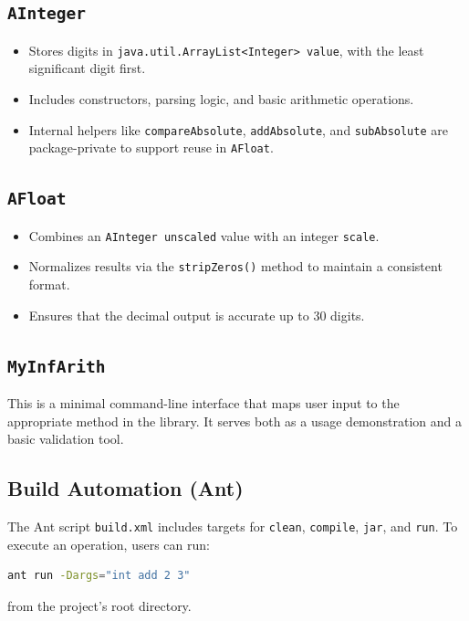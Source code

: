 \documentclass[12pt]{article}
\begin{document}
\subsection{\texttt{AInteger}}
\begin{itemize}
  \item Stores digits in \texttt{java.util.ArrayList<Integer> value}, with the least significant digit first.
  \item Includes constructors, parsing logic, and basic arithmetic operations.
  \item Internal helpers like \texttt{compareAbsolute}, \texttt{addAbsolute}, and \texttt{subAbsolute} are package-private to support reuse in \texttt{AFloat}.
\end{itemize}

\subsection{\texttt{AFloat}}
\begin{itemize}
  \item Combines an \texttt{AInteger unscaled} value with an integer \texttt{scale}.
  \item Normalizes results via the \texttt{stripZeros()} method to maintain a consistent format.
  \item Ensures that the decimal output is accurate up to 30 digits.
\end{itemize}

\subsection{\texttt{MyInfArith}}
This is a minimal command-line interface that maps user input to the appropriate method in the library. It serves both as a usage demonstration and a basic validation tool.

\subsection{Build Automation (Ant)}
The Ant script \texttt{build.xml} includes targets for \texttt{clean}, \texttt{compile}, \texttt{jar}, and \texttt{run}. To execute an operation, users can run:

\lstset{showstringspaces=false}
\begin{lstlisting}[language=bash]
ant run -Dargs="int add 2 3"
\end{lstlisting}

from the project’s root directory.
\end{document}
